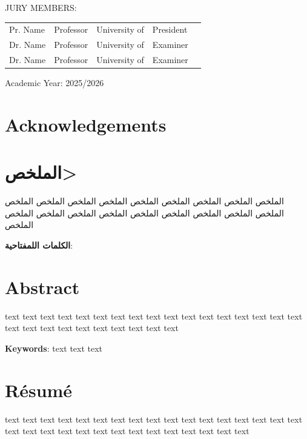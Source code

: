 \documentclass[12pt,a4paper]{report}
\begin{document}
JURY MEMBERS:\\

\begin{center}
\begin{tabular}{lllll}
Pr. Name  & Professor & University of  & President\\
Dr. Name  & Professor & University of  & Examiner\\
Dr. Name  & Professor & University of  & Examiner\\
\end{tabular}
\end{center}
\begin{center}
Academic Year: 2025/2026
\end{center}
\newpage

\chapter*{Acknowledgements}
\thispagestyle{empty}

%

\chapter*{\<الملخص>}
\thispagestyle{empty}
\begin{arabtex}
الملخص الملخص الملخص الملخص الملخص الملخص الملخص الملخص الملخص الملخص الملخص الملخص الملخص الملخص الملخص الملخص الملخص الملخص الملخص 

\vspace{5mm} %
\textbf{الكلمات اللمفتاحية}:

\end{arabtex}


\chapter*{Abstract}
\thispagestyle{empty}
\begin{sloppypar}
text text text text text text text text text text text text text text text text text text text text text text text text text text text 


\textbf{Keywords}: text text text
\end{sloppypar}



\chapter*{Résumé}
\thispagestyle{empty}
% 
text text text text text text text text text text text text text text text text text text text text text text text text text text text text text text text
\end{document}

